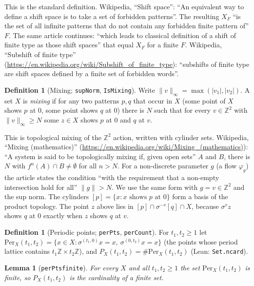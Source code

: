 \documentclass[11pt]{article}
\newtheorem{lemma}[theorem]{Lemma}
\theoremstyle{definition}
\newtheorem{definition}[theorem]{Definition}
\theoremstyle{remark}
\renewcommand{\_}{\oldus\allowbreak}
\newcommand{\Z}{\mathbb{Z}}
\newcommand{\Per}{\mathrm{Per}}
\newcommand{\lean}[1]{\texttt{#1}}
\begin{document}
This is the standard definition. Wikipedia, ``Shift space'': ``An equivalent way to define a shift
space is to take a set of forbidden patterns''. The resulting $X_F$ ``is the set of all infinite
patterns that do not contain any forbidden finite pattern of'' $F$. The same article continues:
``which leads to classical definition of a shift of finite type as those shift spaces'' that equal
$X_F$ for a finite $F$. Wikipedia, ``Subshift of finite type''
(\url{https://en.wikipedia.org/wiki/Subshift_of_finite_type}): ``subshifts of finite type are shift
spaces defined by a finite set of forbidden words''.

\begin{definition}[Mixing; \lean{supNorm}, \lean{IsMixing}]
Write $\|v\|_\infty=\max(|v_1|,|v_2|)$. A set $X$ is \emph{mixing} if for any two patterns $p,q$ that
occur in $X$ (some point of $X$ shows $p$ at $0$, some point shows $q$ at $0$) there is $N$ such that for
every $v\in\Z^2$ with $\|v\|_\infty\ge N$ some $z\in X$ shows $p$ at $0$ and $q$ at $v$.
\end{definition}

This is topological mixing of the $\Z^2$ action, written with cylinder sets. Wikipedia, ``Mixing
(mathematics)'' (\url{https://en.wikipedia.org/wiki/Mixing_(mathematics)}): ``A system is said to be
topologically mixing if, given open sets'' $A$ and $B$, there is $N$ with $f^n(A)\cap B\neq\emptyset$
for all $n>N$. For a non-discrete parameter $g$ (a flow $\varphi_g$) the article states the
condition ``with the requirement that a non-empty intersection hold for all'' $\|g\|>N$. We use the
same form with $g=v\in\Z^2$ and the sup norm. The cylinders
$[p]=\{x : x \text{ shows } p \text{ at } 0\}$ form a basis of the product topology. The point $z$
above lies in $[p]\cap\sigma^{-v}[q]\cap X$, because $\sigma^v z$ shows $q$ at $0$ exactly when $z$
shows $q$ at $v$.

\begin{definition}[Periodic points; \lean{perPts}, \lean{perCount}]
For $t_1,t_2\ge1$ let $\Per_X(t_1,t_2)=\{x\in X:\sigma^{(t_1,0)}x=x,\ \sigma^{(0,t_2)}x=x\}$ (the points
whose period lattice contains $t_1\Z\times t_2\Z$), and $P_X(t_1,t_2)=\#\Per_X(t_1,t_2)$ (Lean:
\lean{Set.ncard}).
\end{definition}

\begin{lemma}[\lean{perPts\_finite}]\label{lem:finite}
For every $X$ and all $t_1,t_2\ge1$ the set $\Per_X(t_1,t_2)$ is finite, so $P_X(t_1,t_2)$ is the
cardinality of a finite set.
\end{lemma}
\end{document}
